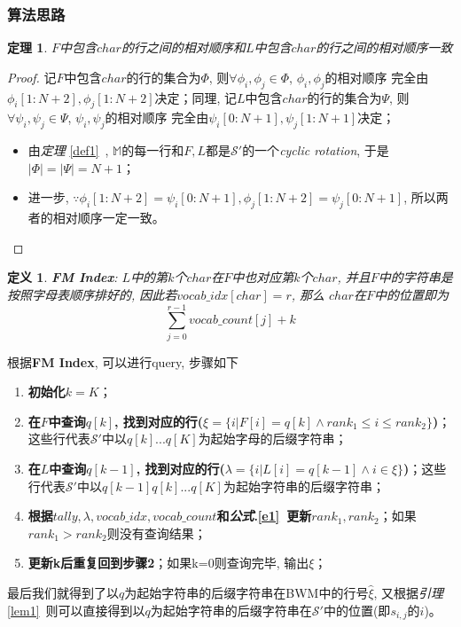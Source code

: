 \documentclass[UTF8]{ctexart}
\newcommand{\refe}[1]{\emph{公式}.\ref{#1}\ }
\newcommand{\reft}[1]{\emph{定理} \ref{#1}\ }
\newcommand{\refl}[1]{\emph{引理} \ref{#1}\ }
\newtheorem{define}{定义}
\newtheorem{theory}{定理}
\begin{document}
    \subsubsection{算法思路}
    \begin{theory}
        \label{the2}
        $F$中包含$char$的行之间的相对顺序和$L$中包含$char$的行之间的相对顺序一致
    \end{theory}
    \begin{proof}
        记$F$中包含$char$的行的集合为$\Phi$, 则$\forall \phi_i,\phi_j \in \Phi$, $\phi_i, \phi_j$的相对顺序
        完全由$\phi_i[1:N+2],\phi_j[1:N+2]$决定；同理, 记$L$中包含$char$的行的集合为$\Psi$, 则$\forall \psi_i,\psi_j \in \Psi$, $\psi_i, \psi_j$的相对顺序
        完全由$\psi_i[0:N+1],\psi_j[1:N+1]$决定；\begin{itemize}
            \item 由\reft{def1}, $\mathbb{M}$的每一行和$F,L$都是$\mathcal{S}'$的一个\emph{cyclic rotation}, 
            于是$|\Phi| = |\Psi| = N+1$；
            \item 进一步, $\because \phi_i[1:N+2] = \psi_i[0:N+1] , \phi_j[1:N+2] = \psi_j[0:N+1]$, 所以两者的相对顺序一定一致。
        \end{itemize}    
    \end{proof}
    \begin{define}
        \label{def2}
        \textbf{FM Index}: $L$中的第$k$个$char$在$F$中也对应第$k$个$char$, 并且$F$中的字符串是按照字母表顺序排好的, 因此若$vocab\_idx[char] = r$, 那么
        $char$在$F$中的位置即为\begin{equation}
            \label{e1}
            \sum_{j = 0}^{r-1}vocab\_count[j] + k
        \end{equation}
    \end{define}
    \noindent 根据\textbf{FM Index}, 可以进行query, 步骤如下\begin{enumerate}
        \item \textbf{初始化$k=K$}；
        \item \textbf{在$F$中查询$q[k]$, 找到对应的行($\xi= \{i | F[i] = q[k] \wedge rank_1 \leq i \leq rank_2 \}$)}；这些行代表$\mathcal{S'}$中以$q[k]...q[K]$为起始字母的后缀字符串；
        \item \textbf{在$L$中查询$q[k-1]$, 找到对应的行($\lambda = \{i | L[i] = q[k-1] \wedge i \in \xi \}$)}；这些行代表$\mathcal{S'}$中以$q[k-1]q[k]...q[K]$为起始字符串的后缀字符串；
        \item \textbf{根据$tally, \lambda, vocab\_idx, vocab\_count$和\refe{e1}更新$rank_1, rank_2$}；如果$rank_1 > rank_2$则没有查询结果；
        \item \textbf{更新k后重复回到步骤2}；如果k=0则查询完毕, 输出$\xi$；
    \end{enumerate}
    \noindent 最后我们就得到了以$q$为起始字符串的后缀字符串在BWM中的行号$\hat{\xi}$, 又根据\refl{lem1}则可以直接得到以$q$为起始字符串的后缀字符串在$\mathcal{S'}$中的位置(即$s_{i,j}$的$i$)。
\end{document}
